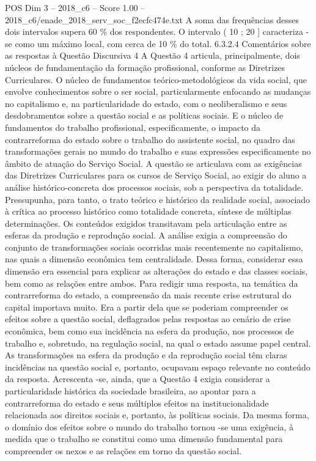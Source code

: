 \begin{textsample}{POS Dim 3 – 2018\_c6 – Score 1.00 – 2018\_c6/enade\_2018\_serv\_soc\_f2ecfc474e.txt}
A soma das frequências desses dois intervalos supera 60 \% dos respondentes.
O intervalo ( 10 ; 20 ] caracteriza -se como um máximo local, com cerca de 10 \% do total. 6.3.2.4 Comentários sobre as respostas à Questão Discursiva 4 A Questão 4 articula, principalmente, dois núcleos de fundamentação da formação profissional, conforme as Diretrizes Curriculares.
O núcleo de fundamentos teórico-metodológicos da vida social, que envolve conhecimentos sobre o ser social, particularmente enfocando as mudanças no capitalismo e, na particularidade do estado, com o neoliberalismo e seus desdobramentos sobre a questão social e as políticas sociais.
E o núcleo de fundamentos do trabalho profissional, especificamente, o impacto da contrarreforma do estado sobre o trabalho do assistente social, no quadro das transformações gerais no mundo do trabalho e suas expressões especificamente no âmbito de atuação do Serviço Social.
A questão se articulava com as exigências das Diretrizes Curriculares para os cursos de Serviço Social, ao exigir do aluno a análise histórico-concreta dos processos sociais, sob a perspectiva da totalidade.
Pressupunha, para tanto, o trato teórico e histórico da realidade social, associado à crítica ao processo histórico como totalidade concreta, síntese de múltiplas determinações.
Os conteúdos exigidos transitavam pela articulação entre as esferas da produção e reprodução social.
A análise exigia a compreensão do conjunto de transformações sociais ocorridas mais recentemente no capitalismo, nas quais a dimensão econômica tem centralidade.
Dessa forma, considerar essa dimensão era essencial para explicar as alterações do estado e das classes sociais, bem como as relações entre ambos.
Para redigir uma resposta, na temática da contrarreforma do estado, a compreensão da mais recente crise estrutural do capital importava muito.
Era a partir dela que se poderiam compreender os efeitos sobre a questão social, deflagrados pelas respostas ao cenário de crise econômica, bem como sua incidência na esfera da produção, nos processos de trabalho e, sobretudo, na regulação social, na qual o estado assume papel central.
As transformações na esfera da produção e da reprodução social têm claras incidências na questão social e, portanto, ocupavam espaço relevante no conteúdo da resposta.
Acrescenta -se, ainda, que a Questão 4 exigia considerar a particularidade histórica da sociedade brasileira, ao apontar para a contrarreforma do estado e seus múltiplos efeitos na institucionalidade relacionada aos direitos sociais e, portanto, às políticas sociais.
Da mesma forma, o domínio dos efeitos sobre o mundo do trabalho tornou -se uma exigência, à medida que o trabalho se constitui como uma dimensão fundamental para compreender os nexos e as relações em torno da questão social.

\end{textsample}
